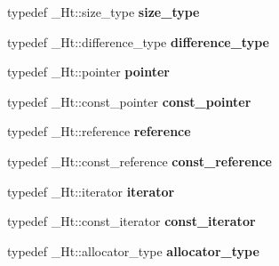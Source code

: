 \begin{DoxyCompactItemize}
\mbox{\label{classhash__map_a426eeb19be81c2abf01713045b00273c}} 
typedef \+\_\+\+Ht\+::size\+\_\+type {\bfseries size\+\_\+type}
\item 
\mbox{\label{classhash__map_a09a8d2e2ee9140dbb3ad4ff41c9913f1}} 
typedef \+\_\+\+Ht\+::difference\+\_\+type {\bfseries difference\+\_\+type}
\item 
\mbox{\label{classhash__map_a09684b4e420b18c438e0371f65b3f97f}} 
typedef \+\_\+\+Ht\+::pointer {\bfseries pointer}
\item 
\mbox{\label{classhash__map_a3f0e551b26e7a3b7408130f89f947efa}} 
typedef \+\_\+\+Ht\+::const\+\_\+pointer {\bfseries const\+\_\+pointer}
\item 
\mbox{\label{classhash__map_a71ab911699a85d57c8376a2b277b9a68}} 
typedef \+\_\+\+Ht\+::reference {\bfseries reference}
\item 
\mbox{\label{classhash__map_a5679aa87768bb6fe16c9e752aa25b3ed}} 
typedef \+\_\+\+Ht\+::const\+\_\+reference {\bfseries const\+\_\+reference}
\item 
\mbox{\label{classhash__map_a31f7bf123b965ce6e8591041a1f8e41d}} 
typedef \+\_\+\+Ht\+::iterator {\bfseries iterator}
\item 
\mbox{\label{classhash__map_a75230569f462697a4198ebf8fd9c3a98}} 
typedef \+\_\+\+Ht\+::const\+\_\+iterator {\bfseries const\+\_\+iterator}
\item 
\mbox{\label{classhash__map_a3ed2a157a71c5ca57c85f99bfdcb2171}} 
typedef \+\_\+\+Ht\+::allocator\+\_\+type {\bfseries allocator\+\_\+type}
\end{DoxyCompactItemize}
